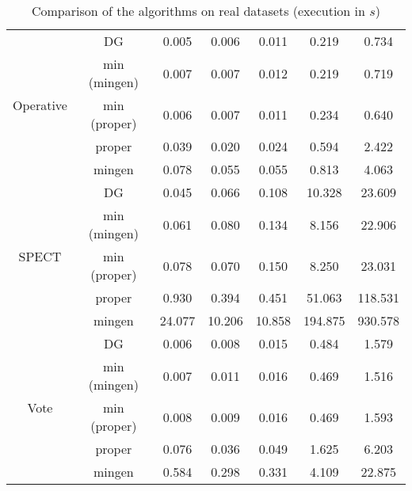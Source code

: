 \begin{table}[H]
\begin{tabular}{| c | c || c | c | c | c | c |}
		\multirow{5}{*}{Operative} 
		& DG           & 0.005 & 0.006 & 0.011 & 0.219 & 0.734 \\
		& min (mingen) & 0.007 & 0.007 & 0.012 & 0.219 & 0.719 \\
		& min (proper) & 0.006 & 0.007 & 0.011 & 0.234 & 0.640 \\
		& proper       & 0.039 & 0.020 & 0.024 & 0.594 & 2.422 \\
		& mingen       & 0.078 & 0.055 & 0.055 & 0.813 & 4.063 \\ \hline
		
		\multirow{5}{*}{SPECT}
		& DG           & 0.045 & 0.066 & 0.108 & 10.328 & 23.609 \\
		& min (mingen) & 0.061 & 0.080 & 0.134 & 8.156 & 22.906 \\
		& min (proper) & 0.078 & 0.070 & 0.150 & 8.250 & 23.031 \\
		& proper       & 0.930 & 0.394 & 0.451 & 51.063 & 118.531 \\
		& mingen       & 24.077 & 10.206 & 10.858 & 194.875 & 930.578 \\ \hline
		
		\multirow{5}{*}{Vote}
		& DG           & 0.006 & 0.008 & 0.015 & 0.484 & 1.579 \\ 
		& min (mingen) & 0.007 & 0.011 & 0.016 & 0.469 & 1.516 \\
		& min (proper) & 0.008 & 0.009 & 0.016 & 0.469 & 1.593 \\
		& proper       & 0.076 & 0.036 & 0.049 & 1.625 & 6.203 \\
		& mingen       & 0.584 & 0.298 & 0.331 & 4.109 & 22.875 \\ \hline
		
		
	\end{tabular} 
	\caption{Comparison of the algorithms on real datasets (execution in $s$)}
	\label{tab:real-exe}
\end{table}

\vspace{1.2em}

